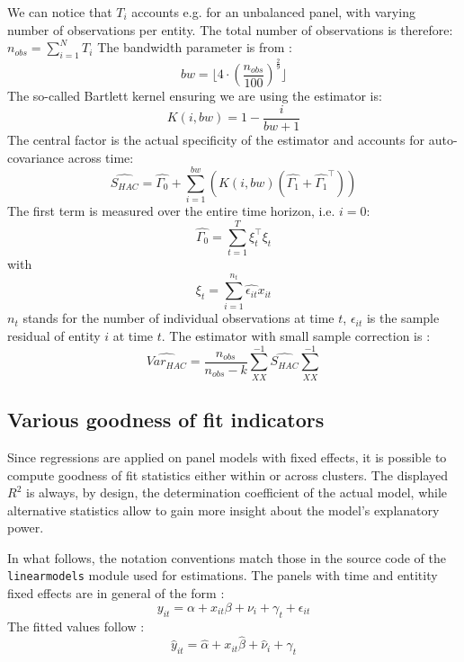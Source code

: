 We can notice that $T_{i}$ accounts e.g. for an unbalanced panel, with varying number of observations per entity. The total number of observations is therefore: $n_{obs} = \sum_{i = 1}^N T_{i}$
The bandwidth parameter is from \textcite{Newey1987}:
\begin{equation}
bw = \lfloor 4\cdot\left(\frac{n_{obs}}{100}\right)^{\frac{2}{9}} \rfloor
\end{equation}
The so-called Bartlett kernel ensuring we are using the \textcite{Newey1987} estimator is:
\begin{equation}
  K(i, bw) = 1 - \frac{i}{bw + 1}
\end{equation}
The central factor is the actual specificity of the \textcite{Newey1987} estimator and accounts for auto-covariance across time:
\begin{equation}
  \hat{S_{HAC}} = \hat{\Gamma_0} + \sum_{i = 1}^{bw} (K(i, bw) (\hat{\Gamma_1} + \hat{\Gamma_1}^\intercal))
\end{equation}
The first term is measured over the entire time horizon, i.e. $i = 0$:
\begin{equation}
  \hat{\Gamma_0} = \sum_{t = 1}^T \xi_t^\intercal \xi_t
\end{equation}
with
\begin{equation}
  \xi_t = \sum_{i = 1}^{n_t} \hat{\epsilon_{it}} x_{it}
  \end{equation}
$n_t$ stands for the number of individual observations at time $t$, $\epsilon_{it}$ is the sample residual of entity $i$ at time $t$.
The \textcite{Newey1987} estimator with small sample correction is :
\begin{equation}
  \hat{Var_{HAC}} = \frac{n_{obs}}{n_{obs} - k} \sum_{XX}^{-1} \hat{S_{HAC}} \sum_{XX}^{-1}
\end{equation}

\subsection{Various goodness of fit indicators}
Since regressions are applied on panel models with fixed effects, it is possible to compute goodness of fit statistics either within or across clusters. The displayed $R^2$ is always, by design, the determination coefficient of the actual model, while alternative statistics allow to gain more insight about the model's explanatory power.

In what follows, the notation conventions match those in the source code of the \texttt{linearmodels} module used for estimations. The panels with time and entitity fixed effects are in general of the form :
\begin{equation}
  y_{it} = \alpha + x_{it}\beta + \nu_{i} + \gamma_{t} + \epsilon_{it}
  \label{app:eq:panel:model}
\end{equation}
The fitted values follow :
\begin{equation}
  \hat{y}_{it} = \hat{\alpha} + x_{it}\hat{\beta} + \hat{\nu}_{i} + \hat{\gamma}_{t}
  \label{app:eq:panel:fitted}
\end{equation}

